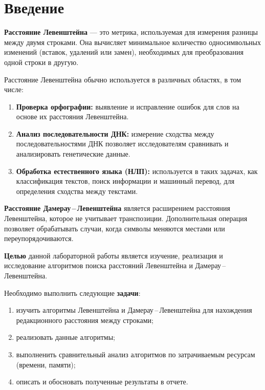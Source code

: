 \chapter*{Введение}

\textbf{Расстояние Левенштейна} — это метрика, используемая для измерения разницы между двумя строками. Она вычисляет минимальное количество односимвольных изменений (вставок, удалений или замен), необходимых для преобразования одной строки в другую.

Расстояние Левенштейна обычно используется в различных областях, в том числе:
\begin{enumerate}
    \item \textbf{Проверка орфографии:} выявление и исправление ошибок для слов на основе их расстояния Левенштейна.
    \item \textbf{Анализ последовательности ДНК:} измерение сходства между последовательностями ДНК позволяет исследователям сравнивать и анализировать генетические данные.
    \item \textbf{Обработка естественного языка (НЛП):} используется в таких задачах, как классификация текстов, поиск информации и машинный перевод, для определения сходства между текстами.
\end{enumerate}

\textbf{Расстояние Дамерау\,--\,Левенштейна} является расширением расстояния Левенштейна, которое не учитывает транспозиции. Дополнительная операция позволяет обрабатывать случаи, когда символы меняются местами или переупорядочиваются.

\textbf{Целью} данной лабораторной работы является изучение, реализация и исследование алгоритмов поиска расстояний Левенштейна и Дамерау\,--\,Левенштейна.

Необходимо выполнить следующие \textbf{задачи}:
\begin{enumerate}[label={\arabic*)}]
    \item изучить алгоритмы Левенштейна и Дамерау\,--\,Левенштейна для нахождения редакционного расстояния между строками;
    \item реализовать данные алгоритмы;
    \item выполненить сравнительный анализ алгоритмов по затрачиваемым ресурсам (времени, памяти);
    \item описать и обосновать полученные результаты в отчете.
\end{enumerate}